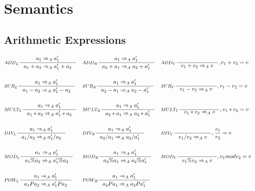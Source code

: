 \section{Semantics}
\subsection{Arithmetic Expressions}

\begin{align*}
&\inference[$ADD_L$]{a_1 \Rightarrow_A a_1'}
                    {a_1 + a_2 \Rightarrow_A a_1' + a_2}
&
&\inference[$ADD_R$]{a_1 \Rightarrow_A a_1'}
										{a_2 + a_1 \Rightarrow_A a_2 + a_1'}
&
&\inference[$ADD_V$]{}
                    {v_1 + v_2 \Rightarrow_A v}
										{, v_1 + v_2 = v}
\\\\
&\inference[$SUB_L$]{a_1 \Rightarrow_A a_1'}
                    {a_1 - a_2 \Rightarrow_A a_1' - a_2}
&
&\inference[$SUB_R$]{a_1 \Rightarrow_A a_1'}
                    {a_2 - a_1 \Rightarrow_A a_2 - a_1'}
&
&\inference[$SUB_V$]{}
                    {v_1 - v_2 \Rightarrow_A v}
										{, v_1 - v_2 = v}
\\\\
&\inference[$MULT_L$]{a_1 \Rightarrow_A a_1'}
                     {a_1 * a_2 \Rightarrow_A a_1' * a_2}
&
&\inference[$MULT_R$]{a_1 \Rightarrow_A a_1'}
                     {a_2 * a_1 \Rightarrow_A a_2 * a_1'}
&
&\inference[$MULT_V$]{}
                     {v_1 * v_2 \Rightarrow_A v}
										 {, v_1 * v_2 = v}
\\\\
&\inference[$DIV_L$]{a_1 \Rightarrow_A a_1'}
                    {a_1 / a_2 \Rightarrow_A a_1' / a_2}
&
&\inference[$DIV_R$]{a_1 \Rightarrow_A a_1'}
                    {a_2 / a_1 \Rightarrow_A a_2 / a_1'}
&
&\inference[$DIV_V$]{}
                    {v_1 / v_2 \Rightarrow_A v}
										{, \frac{v_1}{v_2} = v}
\\\\
&\inference[$MOD_L$]{a_1 \Rightarrow_A a_1'}
                    {a_1 \% a_2 \Rightarrow_A a_1' \% a_2}
&
&\inference[$MOD_R$]{a_1 \Rightarrow_A a_1'}
                    {a_2 \% a_1 \Rightarrow_A a_2 \% a_1'}
&
&\inference[$MOD_V$]{}
                    {v_1 \% v_2 \Rightarrow_A v}
										{, v_1 mod v_2 = v}
\\\\
&\inference[$POW_L$]{a_1  \Rightarrow_A a_1'}
                    {a_1 P a_2 \Rightarrow_A a_1' P a_2}
&
&\inference[$POW_R$]{a_1 \Rightarrow_A a_1'}
                    {a_2 P a_1 \Rightarrow_A a_2 P a_1'}

\end{align*}
